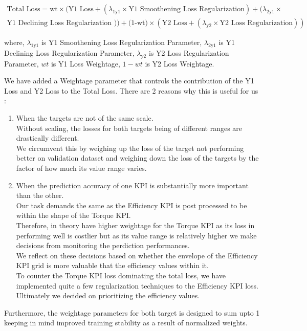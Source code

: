 \documentclass{report} %
\begin{document}
\vspace{0.2cm} %

\begin{equation}
    \begin{split}
\text{Total Loss} = \text{wt} \times (\text{Y1 Loss} + (\lambda_{\text{1y1}} \times \text{Y1 Smoothening Loss Regularization}) +  (\lambda_{\text{2y1}} \times \\
\text{Y1 Declining Loss Regularization })) + \text{(1-wt)} \times (\text{Y2 Loss} + (\lambda_{\text{y2}} \times \text{Y2 Loss Regularization}))
    \end{split}
    \label{eq:Total Loss}
\end{equation}

where, \(\lambda_{\text{1y1}}\) is Y1 Smoothening Loss Regularization Parameter, \(\lambda_{\text{2y1}}\) is Y1 Declining Loss Regularization Parameter,
        \(\lambda_{\text{y2}}\) is Y2 Loss Regularization Parameter, \(wt\) is Y1 Loss Weightage, \(1-wt\) is Y2 Loss Weightage.

We have added a Weightage parameter that controls the contribution of the Y1 Loss and Y2 Loss to the Total Loss. There are 2 reasons why this is useful for us :\\

\begin{enumerate}
    \item  When the targets are not of the same scale. \\
    Without scaling, the losses for both targets being of different ranges are drastically different.\\
    We circumvent this by weighing up the loss of the target not performing better on validation dataset and weighing down the loss of the targets by the factor of how much its value range varies. \\
    \item When the prediction accuracy of one \ac{KPI} is substantially more important than the other. \\
    Our task demands the same as the Efficiency \ac{KPI} is post processed to be within the shape of the Torque \ac{KPI}. \\
    Therefore, in theory have higher weightage for the Torque \ac{KPI} as its loss in performing well is costlier but as its value range is relatively higher we make decisions from monitoring the perdiction performances.\\
    We reflect on these decisions based on whether the envelope of the Efficiency \ac{KPI} grid is more valuable that the efficiency values within it.\\
    To counter the Torque \ac{KPI} loss dominating the total loss, we have implemented quite a few regularization techniques to the Efficiency \ac{KPI} loss.\\
    Ultimately we decided on prioritizing the efficiency values.
\end{enumerate}
Furthermore, the weightage parameters for both target is designed to sum upto 1 keeping in mind improved training stability as a result of normalized weights. \\
\end{document}
